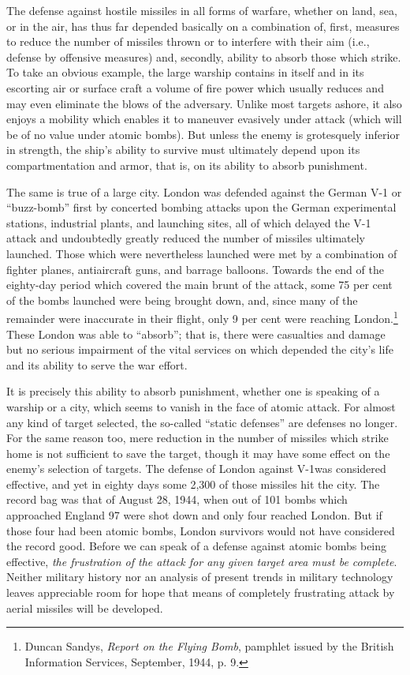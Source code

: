 The defense against hostile missiles in all forms of warfare, whether on land, sea, or in the air, has thus far depended basically on a combination of, first, measures to reduce the number of missiles thrown or to interfere with their aim (i.e., defense by offensive measures) and, secondly, ability to absorb those which strike. To take an obvious example, the large warship contains in itself and in its escorting air or surface craft a volume of fire power which usually reduces and may even eliminate the blows of the adversary. Unlike most targets ashore, it also enjoys a mobility which enables it to maneuver evasively under attack (which will be of no value under atomic bombs). But unless the enemy is grotesquely inferior in strength, the ship's ability to survive must ultimately depend upon its compartmentation and armor, that is, on its ability to absorb punishment.

The same is true of a large city. London was defended against the German V-1 or ``buzz-bomb'' first by concerted bombing attacks upon the German experimental stations, industrial plants, and launching sites, all of which delayed the V-1 attack and undoubtedly greatly reduced the number of missiles ultimately launched. Those which were nevertheless launched were met by a combination of fighter planes, antiaircraft guns, and barrage balloons. Towards the end of the eighty-day period which covered the main brunt of the attack, some 75 per cent of the bombs launched were being brought down, and, since many of the remainder were inaccurate in their flight, only 9 per cent were reaching London.\footnote{Duncan Sandys, \textit{Report on the Flying Bomb}, pamphlet issued by the British Information Services, September, 1944, p. 9.} These London was able to ``absorb''; that is, there were casualties and damage but no serious impairment of the vital services on which depended the city's life and its ability to serve the war effort.

It is precisely this ability to absorb punishment, whether one is speaking of a warship or a city, which seems to vanish in the face of atomic attack. For almost any kind of target selected, the so-called ``static defenses'' are defenses no longer. For the same reason too, mere reduction in the number of missiles which strike home is not sufficient to save the target, though it may have some effect on the enemy's selection of targets. The defense of London against V-1was considered effective, and yet in eighty days some 2,300 of those missiles hit the city. The record bag was that of August 28, 1944, when out of 101 bombs which approached England 97 were shot down and only four reached London. But if those four had been atomic bombs, London survivors would not have considered the record good. Before we can speak of a defense against atomic bombs being effective, \label{I-frustrate} \emph{the frustration of the attack for any given target area must be complete}. Neither military history nor an analysis of present trends in military technology leaves appreciable room for hope that means of completely frustrating attack by aerial missiles will be developed.

